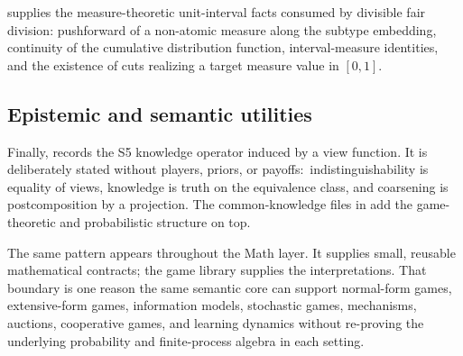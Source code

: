  supplies the measure-theoretic
unit-interval facts consumed by divisible fair division: pushforward of
a non-atomic measure along the subtype embedding, continuity of the
cumulative distribution function, interval-measure identities, and the
existence of cuts realizing a target measure value in $[0,1]$.

\subsection{Epistemic and semantic utilities}
\label{sec:math-layer:semantic}

Finally,  records the S5 knowledge operator
induced by a view function.  It is deliberately stated without
players, priors, or payoffs:\ indistinguishability is equality of
views, knowledge is truth on the equivalence class, and coarsening is
postcomposition by a projection.  The common-knowledge files in
 add the game-theoretic and probabilistic
structure on top.

The same pattern appears throughout the Math layer.  It supplies
small, reusable mathematical contracts; the game library supplies
the interpretations.  That boundary is one reason the same semantic
core can support normal-form games, extensive-form games,
information models, stochastic games, mechanisms, auctions,
cooperative games, and learning dynamics without re-proving the
underlying probability and finite-process algebra in each setting.

